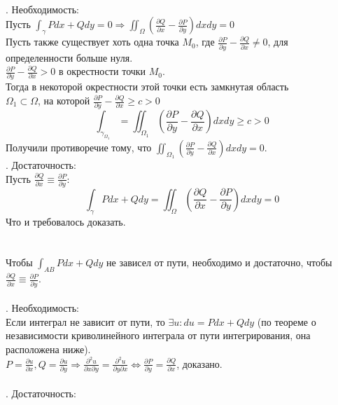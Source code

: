 \documentclass[12pt]{article}
\begin{document}
\\
. Необходимость:\\
Пусть $\int_\gamma Pdx+Qdy=0 \Rightarrow \iint_\Omega(\frac{\partial Q}{\partial x} - \frac{\partial P}{\partial y})dxdy=0$\\
Пусть также существует хоть одна точка $M_0$, где $\frac{\partial P}{\partial y} - \frac{\partial Q}{\partial x} \neq 0$, для определенности больше нуля.\\
$\frac{\partial P}{\partial y} - \frac{\partial Q}{\partial x} > 0$ в окрестности точки $M_0$.\\
Тогда в некоторой окрестности этой точки есть замкнутая область\\ $\Omega_1 \subset \Omega$, на которой $\frac{\partial P}{\partial y} - \frac{\partial Q}{\partial x} \geq c > 0$\\
$$\int_{\gamma_{\Omega_1}}=\iint_{\Omega_1} (\frac{\partial P}{\partial y} - \frac{\partial Q}{\partial x})dxdy \geq c >0$$
Получили противоречие тому, что $\iint_{\Omega_1} (\frac{\partial P}{\partial y} - \frac{\partial Q}{\partial x})dxdy = 0$.\\
. Достаточность:\\
Пусть $\frac{\partial Q}{\partial x} \equiv \frac{\partial P}{\partial y}$:\\
$$\int_\gamma Pdx + Qdy = \iint_\Omega (\frac{\partial Q}{\partial x} - \frac{\partial P}{\partial y})dxdy = 0$$
Что и требовалось доказать.\\
\\
\\
Чтобы $\int_{AB} Pdx+Qdy$ не зависел от пути, необходимо и достаточно, чтобы $\frac{\partial Q}{\partial x} \equiv \frac{\partial P}{\partial y}$.\\
\\
. Необходимость:\\
Если интеграл не зависит от пути, то $\exists u : du = Pdx + Qdy$ (по теореме о независимости криволинейного интеграла от пути интегрирования, она расположена ниже). \\
$P = \frac{\partial u}{\partial x}, Q = \frac{\partial u}{\partial y} \Rightarrow \frac{\partial^2 u}{\partial x \partial y} = \frac{\partial^2 u}{\partial y \partial x} \iff \frac{\partial P}{\partial y} = \frac{\partial Q}{\partial x}$, доказано.\\
\\
. Достаточность:\\
\end{document}
